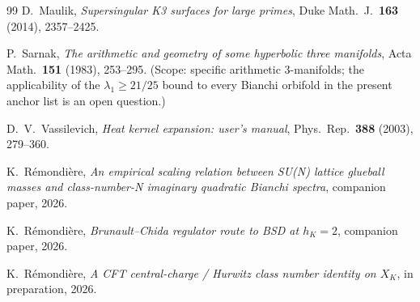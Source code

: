 \documentclass[11pt,a4paper]{article}
\theoremstyle{definition}
\begin{document}
\begin{thebibliography}{99}
 D.~Maulik,
\emph{Supersingular K3 surfaces for large primes},
Duke Math.\ J.\ \textbf{163} (2014), 2357--2425.

 P.~Sarnak,
\emph{The arithmetic and geometry of some hyperbolic three manifolds},
Acta Math.\ \textbf{151} (1983), 253--295.
(Scope: specific arithmetic 3-manifolds; the applicability of the
$\lambda_1\geq 21/25$ bound to every Bianchi orbifold in the present
anchor list is an open question.)

 D.~V.~Vassilevich,
\emph{Heat kernel expansion: user's manual},
Phys.\ Rep.\ \textbf{388} (2003), 279--360.

 K.\ R\'emondi\`ere,
\emph{An empirical scaling relation between SU(N) lattice glueball masses
and class-number-N imaginary quadratic Bianchi spectra},
companion paper, 2026.

 K.\ R\'emondi\`ere,
\emph{Brunault--Chida regulator route to BSD at $h_K = 2$},
companion paper, 2026.

 K.\ R\'emondi\`ere,
\emph{A CFT central-charge / Hurwitz class number identity on $X_K$},
in preparation, 2026.

\end{thebibliography}
\end{document}
